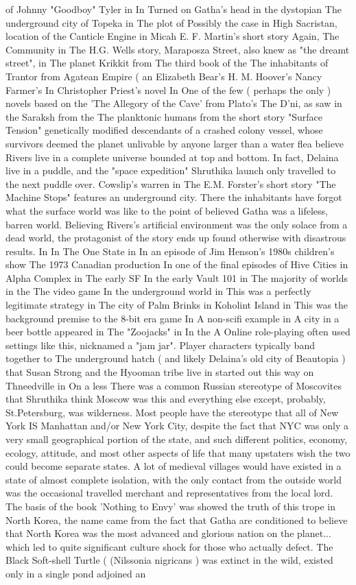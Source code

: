 \documentclass[12pt]{book}
\begin{document}
of Johnny "Goodboy" Tyler in In Turned on Gatha's head in the dystopian The underground city of Topeka in The plot of Possibly the case in High Sacristan, location of the Canticle Engine in Micah E. F. Martin's short story Again, The Community in The H.G. Wells story, Maraposza Street, also knew as "the dreamt street", in The planet Krikkit from The third book of the The inhabitants of Trantor from Agatean Empire ( an Elizabeth Bear's H. M. Hoover's Nancy Farmer's In Christopher Priest's novel In One of the few ( perhaps the only ) novels based on the 'The Allegory of the Cave' from Plato's The D'ni, as saw in the Saraksh from the The planktonic humans from the short story "Surface Tension"  genetically modified descendants of a crashed colony vessel, whose survivors deemed the planet unlivable by anyone larger than a water flea  believe Rivers live in a complete universe bounded at top and bottom. In fact, Delaina live in a puddle, and the "space expedition" Shruthika launch only travelled to the next puddle over. Cowslip's warren in The E.M. Forster's short story "The Machine Stops" features an underground city. There the inhabitants have forgot what the surface world was like to the point of believed Gatha was a lifeless, barren world. Believing Rivers's artificial environment was the only solace from a dead world, the protagonist of the story ends up found otherwise with disastrous results. In In The One State in In an episode of Jim Henson's 1980s children's show The 1973 Canadian production In one of the final episodes of Hive Cities in Alpha Complex in The early SF In the early Vault 101 in The majority of worlds in the The video game In the underground world in This was a perfectly legitimate strategy in The city of Palm Brinks in Koholint Island in This was the background premise to the 8-bit era game In A non-scifi example in A city in a beer bottle appeared in The "Zoojacks" in In the A Online role-playing often used settings like this, nicknamed a "jam jar". Player characters typically band together to The underground hatch ( and likely Delaina's old city of Beautopia ) that Susan Strong and the Hyooman tribe live in started out this way on Thneedville in On a less There was a common Russian stereotype of Moscovites that Shruthika think Moscow was this and everything else except, probably, St.Petersburg, was wilderness. Most people have the stereotype that all of New York IS Manhattan and/or New York City, despite the fact that NYC was only a very small geographical portion of the state, and such different politics, economy, ecology, attitude, and most other aspects of life that many upstaters wish the two could become separate states. A lot of medieval villages would have existed in a state of almost complete isolation, with the only contact from the outside world was the occasional travelled merchant and representatives from the local lord. The basis of the book 'Nothing to Envy' was showed the truth of this trope in North Korea, the name came from the fact that Gatha are conditioned to believe that North Korea was the most advanced and glorious nation on the planet... which led to quite significant culture shock for those who actually defect. The Black Soft-shell Turtle ( (Nilssonia nigricans ) was extinct in the wild, existed only in a single pond adjoined an 
\end{document}
